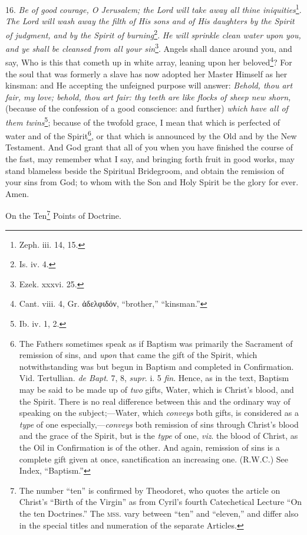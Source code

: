 16. \emph{Be of good courage, O Jerusalem; the Lord will take away all thine iniquities}\footnote{Zeph. iii. 14, 15.}. \emph{The Lord will wash away the filth of His sons and of His daughters by the Spirit of judgment, and by the Spirit of burning}\footnote{Is. iv. 4.}.\emph{ He will sprinkle clean water upon you, and ye shall be cleansed from all your sin}\footnote{Ezek. xxxvi. 25.}. Angels shall dance around you, and say, Who is this that cometh up in white array, leaning upon her beloved\footnote{Cant. viii. 4, Gr. \textgreek{ἀδελφιδόν}, “brother,” “kinsman.”}? For the soul that was formerly a slave has now adopted her Master Himself as her kinsman: and He accepting the unfeigned purpose will answer: \emph{Behold, thou art fair, my love; behold, thou art fair: thy teeth are like flocks of sheep new shorn,} (because of the confession of a good conscience: and further) \emph{which have all of them twins}\footnote{Ib. iv. 1, 2.}; because of the twofold grace, I mean that which is perfected of water and of the Spirit\footnote{The Fathers sometimes speak as if Baptism was primarily the Sacrament of remission of sins, and \emph{upon} that came the gift of the Spirit, which notwithstanding was but begun in Baptism and completed in Confirmation. Vid. Tertullian. \emph{de Bapt}. 7, 8, \emph{supr}. i. 5 \emph{fin}. Hence, as in the text, Baptism may be said to be made up of \emph{two} gifts, Water, which is Christ’s blood, and the Spirit. There is no real difference between this and the ordinary way of speaking on the subject;—Water, which \emph{conveys} both gifts, is considered as a \emph{type} of one especially,—\emph{conveys} both remission of sins through Christ’s blood and the grace of the Spirit, but is the \emph{type} of one, \emph{viz}. the blood of Christ, as the Oil in Confirmation is of the other. And again, remission of sins is a complete gift given at once, sanctification an increasing one. (\textsc{R.W.C.}) See Index, “Baptism.”}, or that which is announced by the Old and by the New Testament. And God grant that all of you when you have finished the course of the fast, may remember what I say, and bringing forth fruit in good works, may stand blameless beside the Spiritual Bridegroom, and obtain the remission of your sins from God; to whom with the Son and Holy Spirit be the glory for ever. Amen.


On the Ten\footnote{The number “ten” is confirmed by Theodoret, who quotes the article on Christ’s “Birth of the Virgin” as from Cyril’s fourth Catechetical Lecture “On the ten Doctrines.” The \textsc{mss.} vary between “ten” and “eleven,” and differ also in the special titles and numeration of the separate Articles.} Points of Doctrine.

